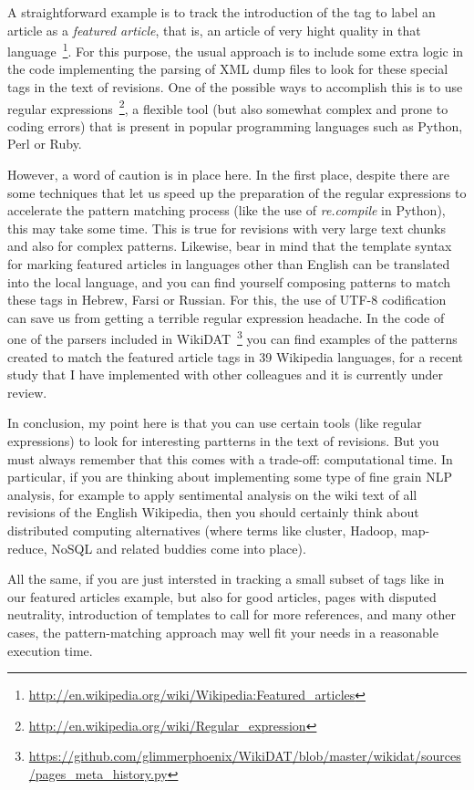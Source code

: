 A straightforward example is to track the introduction of the tag to label an
article as a \textit{featured article}, that is, an article of very hight quality
in that language~\footnote{\url{http://en.wikipedia.org/wiki/Wikipedia:Featured_articles}}.
For this purpose, the usual approach is to include some extra logic in the code
implementing the parsing of XML dump files to look for these special tags in
the text of revisions. One of the possible ways to accomplish this is to use
regular expressions~\footnote{\url{http://en.wikipedia.org/wiki/Regular_expression}},
a flexible tool (but also somewhat complex and prone to coding errors) that is
present in popular programming languages such as Python, Perl or Ruby.

However, a word of caution is in place here. In the first place, despite
there are some techniques that let us speed up the preparation of the regular
expressions to accelerate the pattern matching process (like the use of \textit{re.compile}
in Python), this may take some time. This is true for revisions with very
large text chunks and also for complex patterns. Likewise, bear in mind that
the template syntax for marking featured articles in languages other than English
can be translated into the local language, and you can find yourself composing
patterns to match these tags in Hebrew, Farsi or Russian. For this, the use of
UTF-8 codification can save us from getting a terrible regular expression headache.
In the code of one of the parsers included in 
WikiDAT~\footnote{\url{https://github.com/glimmerphoenix/WikiDAT/blob/master/wikidat/sources/pages_meta_history.py}}
you can find examples of the patterns created to match the featured article 
tags in 39 Wikipedia languages, for a recent study that I have implemented with 
other colleagues and it is currently under review.

In conclusion, my point here is that you can use certain tools (like regular expressions)
to look for interesting partterns in the text of revisions. But you must always
remember that this comes with a trade-off: computational time. In particular,
if you are thinking about implementing some type of fine grain NLP analysis,
for example to apply sentimental analysis on the wiki text of all revisions of
the English Wikipedia, then you should certainly think about distributed computing
alternatives (where terms like cluster, Hadoop, map-reduce, NoSQL and related
buddies come into place).

All the same, if you are just intersted in tracking a small subset of tags like in
our featured articles example, but also for good articles, pages with disputed
neutrality, introduction of templates to call for more references, and many other
cases, the pattern-matching approach may well fit your needs in a reasonable
execution time.

